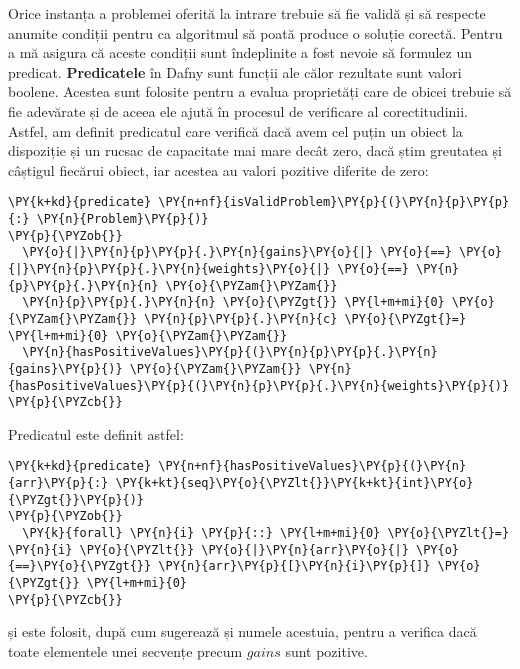 \begin{sloppypar}
Orice instanța a problemei oferită la intrare trebuie să fie validă și să respecte anumite condiții pentru ca algoritmul să poată produce o soluție corectă. Pentru a mă asigura că aceste condiții sunt îndeplinite a fost nevoie să formulez un predicat. \textbf{Predicatele} în Dafny sunt funcții ale călor rezultate sunt valori boolene. \cite{leino2021dafny} Acestea sunt folosite pentru a evalua proprietăți care de obicei trebuie să fie adevărate și de aceea ele ajută în procesul de verificare al corectitudinii. Astfel, am definit predicatul  care verifică dacă avem cel puțin un obiect la dispoziție și un rucsac de capacitate mai mare decât zero, dacă știm greutatea și câștigul fiecărui obiect, iar acestea au valori pozitive diferite de zero:
    \begin{Verbatim}[commandchars=\\\{\}]
\PY{k+kd}{predicate} \PY{n+nf}{isValidProblem}\PY{p}{(}\PY{n}{p}\PY{p}{:} \PY{n}{Problem}\PY{p}{)}
\PY{p}{\PYZob{}}
  \PY{o}{|}\PY{n}{p}\PY{p}{.}\PY{n}{gains}\PY{o}{|} \PY{o}{==} \PY{o}{|}\PY{n}{p}\PY{p}{.}\PY{n}{weights}\PY{o}{|} \PY{o}{==} \PY{n}{p}\PY{p}{.}\PY{n}{n} \PY{o}{\PYZam{}\PYZam{}} 
  \PY{n}{p}\PY{p}{.}\PY{n}{n} \PY{o}{\PYZgt{}} \PY{l+m+mi}{0} \PY{o}{\PYZam{}\PYZam{}} \PY{n}{p}\PY{p}{.}\PY{n}{c} \PY{o}{\PYZgt{}=} \PY{l+m+mi}{0} \PY{o}{\PYZam{}\PYZam{}} 
  \PY{n}{hasPositiveValues}\PY{p}{(}\PY{n}{p}\PY{p}{.}\PY{n}{gains}\PY{p}{)} \PY{o}{\PYZam{}\PYZam{}} \PY{n}{hasPositiveValues}\PY{p}{(}\PY{n}{p}\PY{p}{.}\PY{n}{weights}\PY{p}{)} 
\PY{p}{\PYZcb{}}
\end{Verbatim}
\par Predicatul  este definit astfel:
    \begin{Verbatim}[commandchars=\\\{\}]
\PY{k+kd}{predicate} \PY{n+nf}{hasPositiveValues}\PY{p}{(}\PY{n}{arr}\PY{p}{:} \PY{k+kt}{seq}\PY{o}{\PYZlt{}}\PY{k+kt}{int}\PY{o}{\PYZgt{}}\PY{p}{)}
\PY{p}{\PYZob{}}
  \PY{k}{forall} \PY{n}{i} \PY{p}{::} \PY{l+m+mi}{0} \PY{o}{\PYZlt{}=} \PY{n}{i} \PY{o}{\PYZlt{}} \PY{o}{|}\PY{n}{arr}\PY{o}{|} \PY{o}{==}\PY{o}{\PYZgt{}} \PY{n}{arr}\PY{p}{[}\PY{n}{i}\PY{p}{]} \PY{o}{\PYZgt{}} \PY{l+m+mi}{0}
\PY{p}{\PYZcb{}}
\end{Verbatim}
    și este folosit, după cum sugerează și numele acestuia, pentru a verifica dacă toate elementele unei secvențe precum $\textit{gains}$ sunt pozitive. \\ \par 


\end{sloppypar}
